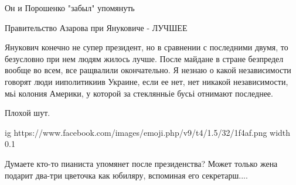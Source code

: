 \begin{itemize}
Он и Порошенко "забыл" упомянуть\Laughey[1.0][white]

 
Правительство Азарова при Януковиче - ЛУЧШЕЕ

 

Янукович конечно не супер президент, но в сравнении с последними двумя, то
безусловно при нем людям жилось лучше. После майдане в стране безпредел вообще
во всем, все ращвалили окончательно. Я незнаю о какой независимости говорят люди
ииполитикиив Украине, если ее нет, нет никакой независимости, мьі колония
Америки, у которой за стеклянньіе бусьі отнимают последнее.


 
Плохой шут.

 

\ifcmt
  ig https://www.facebook.com/images/emoji.php/v9/t4/1.5/32/1f4af.png
  width 0.1
\fi


 

Думаете кто-то пианиста упомянет после президенства? Может только жена подарит
два-три цветочка как юбиляру, вспоминая его секретарш....


 

\end{itemize}
